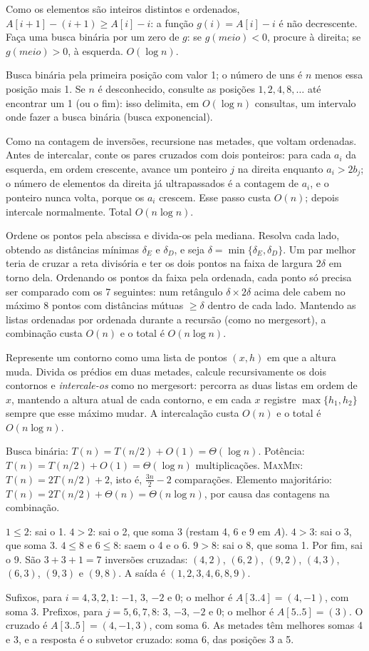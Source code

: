  Como os elementos são inteiros distintos e ordenados, $A[i+1]-(i+1)\ge A[i]-i$: a função $g(i)=A[i]-i$ é não decrescente. Faça uma busca binária por um zero de $g$: se $g(meio)<0$, procure à direita; se $g(meio)>0$, à esquerda. $O(\log n)$.

 Busca binária pela primeira posição com valor 1; o número de uns é $n$ menos essa posição mais 1. Se $n$ é desconhecido, consulte as posições $1,2,4,8,\dots$ até encontrar um 1 (ou o fim): isso delimita, em $O(\log n)$ consultas, um intervalo onde fazer a busca binária (busca exponencial).

 Como na contagem de inversões, recursione nas metades, que voltam ordenadas. Antes de intercalar, conte os pares cruzados com dois ponteiros: para cada $a_i$ da esquerda, em ordem crescente, avance um ponteiro $j$ na direita enquanto $a_i>2b_j$; o número de elementos da direita já ultrapassados é a contagem de $a_i$, e o ponteiro nunca volta, porque os $a_i$ crescem. Esse passo custa $O(n)$; depois intercale normalmente. Total $O(n\log n)$.

 Ordene os pontos pela abscissa e divida-os pela mediana. Resolva cada lado, obtendo as distâncias mínimas $\delta_E$ e $\delta_D$, e seja $\delta=\min\{\delta_E,\delta_D\}$. Um par melhor teria de cruzar a reta divisória e ter os dois pontos na faixa de largura $2\delta$ em torno dela. Ordenando os pontos da faixa pela ordenada, cada ponto só precisa ser comparado com os 7 seguintes: num retângulo $\delta\times2\delta$ acima dele cabem no máximo 8 pontos com distâncias mútuas $\ge\delta$ dentro de cada lado. Mantendo as listas ordenadas por ordenada durante a recursão (como no mergesort), a combinação custa $O(n)$ e o total é $O(n\log n)$.

 Represente um contorno como uma lista de pontos $(x,h)$ em que a altura muda. Divida os prédios em duas metades, calcule recursivamente os dois contornos e \emph{intercale-os} como no mergesort: percorra as duas listas em ordem de $x$, mantendo a altura atual de cada contorno, e em cada $x$ registre $\max\{h_1,h_2\}$ sempre que esse máximo mudar. A intercalação custa $O(n)$ e o total é $O(n\log n)$.

 Busca binária: $T(n)=T(n/2)+O(1)=\Theta(\log n)$. Potência: $T(n)=T(n/2)+O(1)=\Theta(\log n)$ multiplicações. \textsc{MaxMin}: $T(n)=2T(n/2)+2$, isto é, $\frac{3n}2-2$ comparações. Elemento majoritário: $T(n)=2T(n/2)+\Theta(n)=\Theta(n\log n)$, por causa das contagens na combinação.

 $1\le2$: sai o 1. $4>2$: sai o 2, que soma 3 (restam 4, 6 e 9 em $A$). $4>3$: sai o 3, que soma 3. $4\le8$ e $6\le8$: saem o 4 e o 6. $9>8$: sai o 8, que soma 1. Por fim, sai o 9. São $3+3+1=7$ inversões cruzadas: $(4,2)$, $(6,2)$, $(9,2)$, $(4,3)$, $(6,3)$, $(9,3)$ e $(9,8)$. A saída é $(1,2,3,4,6,8,9)$.

 Sufixos, para $i=4,3,2,1$: $-1$, $3$, $-2$ e $0$; o melhor é $A[3..4]=(4,-1)$, com soma 3. Prefixos, para $j=5,6,7,8$: $3$, $-3$, $-2$ e $0$; o melhor é $A[5..5]=(3)$. O cruzado é $A[3..5]=(4,-1,3)$, com soma 6. As metades têm melhores somas 4 e 3, e a resposta é o subvetor cruzado: soma 6, das posições 3 a 5.

